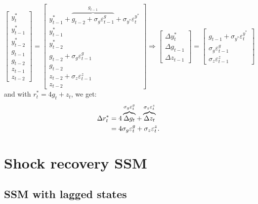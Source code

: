 \documentclass[a4paper,12pt]{article}
\newcommand{\vsp}[1]{\vspace*{#1mm}}\newcommand{\hsp}[1]{\hspace*{#1mm}}  }
\begin{document}
\begin{equation}
\begin{bmatrix}
y_{t}^{\ast } \\ 
y_{t-1}^{\ast } \\ 
y_{t-2}^{\ast } \\ 
g_{t-1} \\ 
g_{t-2} \\ 
z_{t-1} \\ 
z_{t-2}%
\end{bmatrix}%
=%
\begin{bmatrix}
y_{t-1}^{\ast }+\overbrace{g_{t-2}+\sigma _{g}\varepsilon _{t-1}^{g}}%
^{g_{t-1}}+\sigma _{y^{\ast }}\varepsilon _{t}^{y^{\ast }} \\ 
y_{t-1}^{\ast } \\ 
y_{t-2}^{\ast } \\ 
g_{t-2}+\sigma _{g}\varepsilon _{t-1}^{g} \\ 
g_{t-2} \\ 
z_{t-2}+\sigma _{z}\varepsilon _{t-1}^{z} \\ 
z_{t-2}%
\end{bmatrix}%
\Rightarrow 
\begin{bmatrix}
\Delta y_{t}^{\ast } \\ 
\Delta g_{t-1} \\ 
\Delta z_{t-1}%
\end{bmatrix}%
=%
\begin{bmatrix}
g_{t-1}+\sigma _{y^{\ast }}\varepsilon _{t}^{y^{\ast }} \\ 
\sigma _{g}\varepsilon _{t-1}^{g} \\ 
\sigma _{z}\varepsilon _{t-1}^{z}%
\end{bmatrix}
\label{lwb}
\end{equation}%
and with $r_{t}^{\ast }=4g_{t}+z_{t}$, we get: \vsp{-4} 
\begin{align}
\Delta r_{t}^{\ast }& =4\overbrace{\Delta g_{t}}^{\sigma _{g}\varepsilon
_{t}^{g}}+\overbrace{\Delta z_{t}}^{\sigma _{z}\varepsilon _{t}^{z}}  \notag
\\
& =4\sigma _{g}\varepsilon _{t}^{g}+\sigma _{z}\varepsilon _{t}^{z}.
\label{drstar}
\end{align}

\section{Shock recovery SSM}

\subsection{SSM with lagged states}
\end{document}
